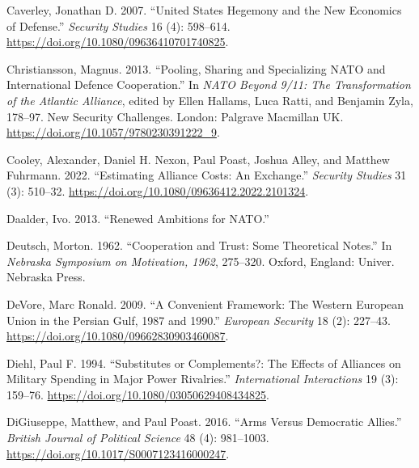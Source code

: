 \documentclass[
  12,
  letterpaper,
  DIV=11,
  numbers=noendperiod]{scrartcl}
\newlength{\cslhangindent}
\newlength{\cslentryspacingunit} %
\newenvironment{CSLReferences}[2] %
 {%
  \setlength{\parindent}{0pt}
  \ifodd #1
  \let\oldpar\par
  \def\par{\hangindent=\cslhangindent\oldpar}
  \fi
  \setlength{\parskip}{#2\cslentryspacingunit}
 }%
 {}
\begin{document}
\begin{CSLReferences}{1}{0}
\leavevmode{}%
Caverley, Jonathan D. 2007. {``United {States Hegemony} and the {New
Economics} of {Defense}.''} \emph{Security Studies} 16 (4): 598--614.
\url{https://doi.org/10.1080/09636410701740825}.

\leavevmode{}%
Christiansson, Magnus. 2013. {``Pooling, {Sharing} and {Specializing}
\textemdash{} {NATO} and {International Defence Cooperation}.''} In
\emph{{NATO} Beyond 9/11: {The Transformation} of the {Atlantic
Alliance}}, edited by Ellen Hallams, Luca Ratti, and Benjamin Zyla,
178--97. New {Security Challenges}. {London}: {Palgrave Macmillan UK}.
\url{https://doi.org/10.1057/9780230391222_9}.

\leavevmode{}%
Cooley, Alexander, Daniel H. Nexon, Paul Poast, Joshua Alley, and
Matthew Fuhrmann. 2022. {``Estimating {Alliance Costs}: {An
Exchange}.''} \emph{Security Studies} 31 (3): 510--32.
\url{https://doi.org/10.1080/09636412.2022.2101324}.

\leavevmode{}%
Daalder, Ivo. 2013. {``Renewed {Ambitions} for {NATO}.''}

\leavevmode{}%
Deutsch, Morton. 1962. {``Cooperation and Trust: {Some} Theoretical
Notes.''} In \emph{Nebraska {Symposium} on {Motivation}, 1962},
275--320. {Oxford, England}: {Univer. Nebraska Press}.

\leavevmode{}%
DeVore, Marc Ronald. 2009. {``A Convenient Framework: The {Western
European Union} in the {Persian Gulf}, 1987 and
1990.''} \emph{European Security} 18 (2): 227--43.
\url{https://doi.org/10.1080/09662830903460087}.

\leavevmode{}%
Diehl, Paul F. 1994. {``Substitutes or Complements?: {The} Effects of
Alliances on Military Spending in Major Power Rivalries.''}
\emph{International Interactions} 19 (3): 159--76.
\url{https://doi.org/10.1080/03050629408434825}.

\leavevmode{}%
DiGiuseppe, Matthew, and Paul Poast. 2016. {``Arms Versus {Democratic
Allies}.''} \emph{British Journal of Political Science} 48 (4):
981--1003. \url{https://doi.org/10.1017/S0007123416000247}.


\end{CSLReferences}
\end{document}
